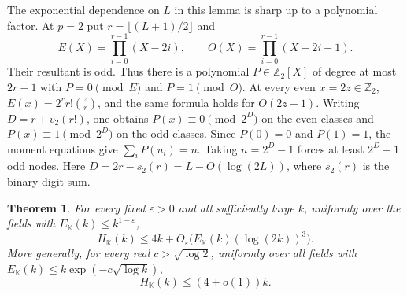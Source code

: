 \documentclass[11pt,letterpaper]{article}
\newtheorem{theorem}{Theorem}[section]
\theoremstyle{definition}
\numberwithin{equation}{section}
\begin{document}
The exponential dependence on $L$ in this lemma is sharp up to
a polynomial factor. At $p=2$ put $r=\lfloor(L+1)/2\rfloor$ and
\[
        E(X)=\prod_{i=0}^{r-1}(X-2i),\qquad
        O(X)=\prod_{i=0}^{r-1}(X-2i-1).
\]
Their resultant is odd. Thus there is a polynomial
$P\in\mathbb Z_2[X]$ of degree at most $2r-1$ with $P=0\pmod E$
and $P=1\pmod O$. At every even $x=2z\in\mathbb Z_2$,
$E(x)=2^rr!\binom zr$, and the same formula holds for $O(2z+1)$.
Writing $D=r+v_2(r!)$, one obtains
$P(x)\equiv0\pmod{2^D}$ on the even classes and
$P(x)\equiv1\pmod{2^D}$ on the odd classes.
Since $P(0)=0$ and $P(1)=1$, the moment equations give
$\sum_iP(u_i)=n$. Taking $n=2^D-1$ forces at least $2^D-1$
odd nodes. Here $D=2r-s_2(r)=L-O(\log(2L))$, where $s_2(r)$
is the binary digit sum.

\begin{theorem}\label{thm:hnearlinear}
For every fixed $\varepsilon>0$ and all sufficiently large $k$,
uniformly over the fields with $E_{\mathbb K}(k)\le k^{1-\varepsilon}$,
\[
 H_{\mathbb K}(k)\le 4k+
          O_{\varepsilon}\bigl(E_{\mathbb K}(k)(\log(2k))^3\bigr).
\]
More generally, for every real $c>\sqrt{\log2}$, uniformly over
all fields with $E_{\mathbb K}(k)\le k\exp(-c\sqrt{\log k})$,
\[
                         H_{\mathbb K}(k)\le (4+o(1))k .
\]
\end{theorem}
\end{document}
